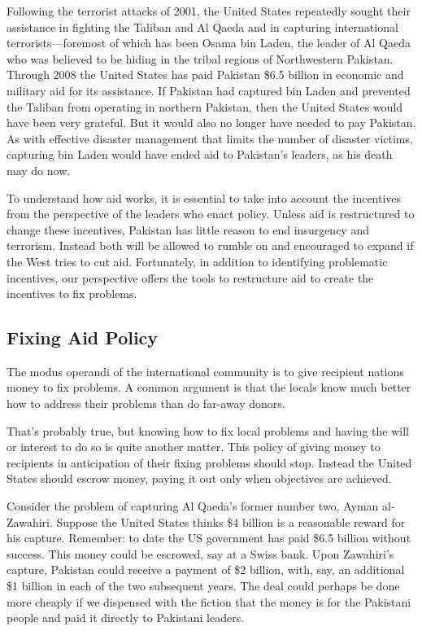 \documentclass[10pt]{article}
\begin{document}
{\large Following the terrorist attacks of 2001, the United States repeatedly
sought their assistance in fighting the Taliban and Al Qaeda and in capturing
international terrorists---foremost of which has been Osama bin Laden, the leader
of Al Qaeda who was believed to be hiding in the tribal regions of Northwestern
Pakistan. Through 2008 the United States has paid Pakistan \$6.5 billion in
economic and military aid for its assistance. If Pakistan had captured bin Laden
and prevented the Taliban from operating in northern Pakistan, then the United
States would have been very grateful. But it would also no longer have needed to
pay Pakistan. As with effective disaster management that limits the number of
disaster victims, capturing bin Laden would have ended aid to Pakistan's leaders,
as his death may do now.}

{\large To understand how aid works, it is essential to take into account the
incentives from the perspective of the leaders who enact policy. Unless aid is
restructured to change these incentives, Pakistan has little reason to end
insurgency and terrorism. Instead both will be allowed to rumble on and
encouraged to expand if the West tries to cut aid. Fortunately, in addition to
identifying problematic incentives, our perspective offers the tools to
restructure aid to create the incentives to fix problems.}

\subsection{Fixing Aid Policy}

{\large The modus operandi of the international community is to give recipient
nations money to fix problems. A common argument is that the locals know much
better how to address their problems than do far-away donors.}

{\large That's probably true, but knowing how to fix local problems and having
the will or interest to do so is quite another matter. This policy of giving
money to recipients in anticipation of their fixing problems should stop. Instead
the United States should escrow money, paying it out only when objectives are
achieved.}

{\large Consider the problem of capturing Al Qaeda's former number two, Ayman
al-Zawahiri. Suppose the United States thinks \$4 billion is a reasonable reward
for his capture. Remember: to date the US government has paid \$6.5 billion
without success. This money could be escrowed, say at a Swiss bank. Upon
Zawahiri's capture, Pakistan could receive a payment of \$2 billion, with, say,
an additional \$1 billion in each of the two subsequent years. The deal could
perhaps be done more cheaply if we dispensed with the fiction that the money is
for the Pakistani people and paid it directly to Pakistani leaders.}
\end{document}
